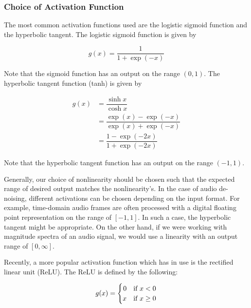 


\subsubsection{Choice of Activation Function}

The most common activation functions used are the logistic sigmoid function and the hyperbolic tangent. \cite{liu2014experiments} The logistic sigmoid function is given by

\begin{equation}
g(x) = \dfrac{1}{1+\exp{(-x)}}
\end{equation}

Note that the sigmoid function has an output on the range $(0,1)$. The hyperbolic tangent function (tanh) is given by

\begin{align}
g(x) &= \dfrac{\sinh{x}}{\cosh{x}}\\
&= \dfrac{\exp{(x)}-\exp{(-x)}}{\exp{(x)}+\exp{(-x)}}\\
&= \dfrac{1-\exp{(-2x)}}{1+\exp{(-2x)}}
\end{align}

Note that the hyperbolic tangent function has an output on the range $(-1,1)$.

Generally, our choice of nonlinearity should be chosen such that the expected range of desired output matches the nonlinearity's. In the case of audio de-noising, different activations can be chosen depending on the input format. For example, time-domain audio frames are often processed with a digital floating point representation on the range of $[-1,1]$. In such a case, the hyperbolic tangent might be appropriate. On the other hand, if we were working with magnitude spectra of an audio signal, we would use a linearity with an output range of $[0,\infty]$.

Recently, a more popular activation function which has in use is the rectified linear unit (ReLU). \cite{glorot2011deep} The ReLU is defined by the following:

\begin{equation}
g(x) =
    \begin{cases}
        \hfill 0 & \text{if $x < 0$}\\
        \hfill x & \text{if $x \ge 0$}
    \end{cases}
\end{equation}

